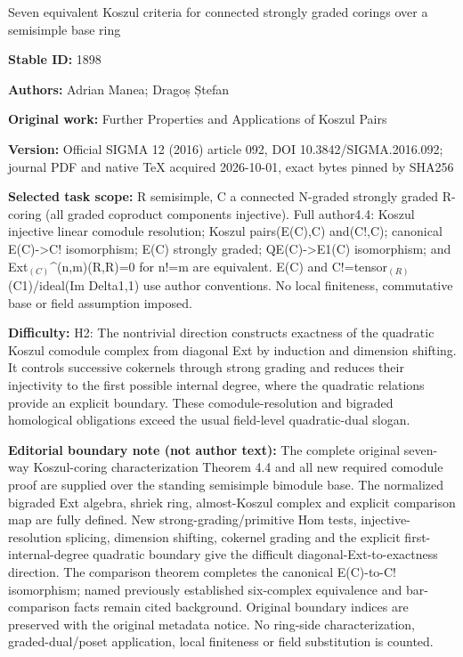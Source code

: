 \documentclass[11pt]{article}
\renewcommand{\^}[1]{\mbox{$^{\left( #1 \right)}$}}
\renewcommand{\_}[1]{\mbox{$_{\left( #1 \right)}$}}
\numberwithin{equation}{section}
\begin{document}
\begin{center}\Large Seven equivalent Koszul criteria for connected strongly graded corings over a semisimple base ring\end{center}
\noindent\textbf{Stable ID:} 1898\par
\noindent\textbf{Authors:} Adrian Manea; Dragoș Ștefan\par
\noindent\textbf{Original work:} Further Properties and Applications of Koszul Pairs\par
\noindent\textbf{Version:} Official SIGMA 12 (2016) article 092, DOI 10.3842/SIGMA.2016.092; journal PDF and native TeX acquired 2026-10-01, exact bytes pinned by SHA256\par
\noindent\textbf{Selected task scope:} R semisimple, C a connected N-graded strongly graded R-coring (all graded coproduct components injective). Full author4.4: Koszul injective linear comodule resolution; Koszul pairs(E(C),C) and(C!,C); canonical E(C)->C! isomorphism; E(C) strongly graded; QE(C)->E1(C) isomorphism; and Ext\_C\textasciicircum{}(n,m)(R,R)=\allowbreak{}0 for n!=\allowbreak{}m are equivalent. E(C) and C!=\allowbreak{}tensor\_R(C1)/ideal(Im Delta1,1) use author conventions. No local finiteness, commutative base or field assumption imposed.\par
\noindent\textbf{Difficulty:} H2: The nontrivial direction constructs exactness of the quadratic Koszul comodule complex from diagonal Ext by induction and dimension shifting. It controls successive cokernels through strong grading and reduces their injectivity to the first possible internal degree, where the quadratic relations provide an explicit boundary. These comodule-resolution and bigraded homological obligations exceed the usual field-level quadratic-dual slogan.\par
\noindent\textbf{Editorial boundary note (not author text):} The complete original seven-way Koszul-coring characterization Theorem 4.4 and all new required comodule proof are supplied over the standing semisimple bimodule base. The normalized bigraded Ext algebra, shriek ring, almost-Koszul complex and explicit comparison map are fully defined. New strong-grading/primitive Hom tests, injective-resolution splicing, dimension shifting, cokernel grading and the explicit first-internal-degree quadratic boundary give the difficult diagonal-Ext-to-exactness direction. The comparison theorem completes the canonical E(C)-to-C! isomorphism; named previously established six-complex equivalence and bar-comparison facts remain cited background. Original boundary indices are preserved with the original metadata notice. No ring-side characterization, graded-dual/poset application, local finiteness or field substitution is counted.\par
\end{document}
